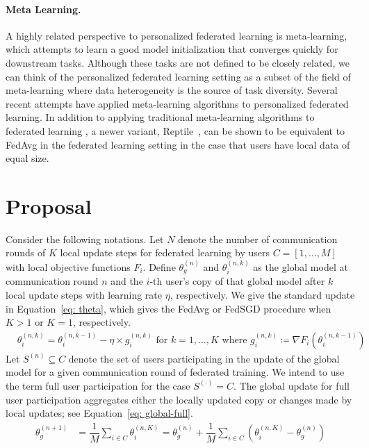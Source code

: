 \documentclass{article}
\begin{document}
%
\paragraph{Meta Learning.}
A highly related perspective to personalized federated learning is meta-learning, which attempts to learn a good model initialization that converges quickly for downstream tasks.
Although these tasks are not defined to be closely related, we can think of the personalized federated learning setting as a subset of the field of meta-learning where data heterogeneity is the source of task diversity. 
Several recent attempts have applied meta-learning algorithms to personalized federated learning.
In addition to applying traditional meta-learning algorithms to federated learning \citep{maml}, a newer variant, Reptile~\citep{reptile}, can be shown to be equivalent to FedAvg in the federated learning setting in the case that users have local data of equal size.




%
\section{Proposal}

Consider the following notations.
Let $N$ denote the number of communication rounds of $K$ local update steps for federated learning by users $C = \left[1, \ldots, M \right]$ with local objective functions $F_i$.
Define $\theta_g^{(n)}$ and $\theta_i^{(n, k)}$ as the global model at communication round $n$ and the $i$-th user's copy of that global model after $k$ local update steps with learning rate $\eta$, respectively.
We give the standard update in Equation~\ref{eq: theta}, which gives the FedAvg or FedSGD procedure when $K > 1$ or $K = 1$, respectively.
\begin{align}
    & \theta_i^{(n, k)} = \theta_i^{(n, k - 1)} - \eta \times g_i^{(n, k)} \textrm{ for } k = 1, \ldots, K \textrm{ where } g_i^{(n, k)} \coloneqq \nabla F_i(\theta_i^{(n, k - 1)}) \label{eq: theta}
\end{align}
Let $S^{(n)} \subseteq C$ denote the set of users participating in the update of the global model for a given communication round of federated training.
We intend to use the term full user participation for the case $S^{(\cdot)} = C$. 
The global update for full user participation aggregates either the locally updated copy or changes made by local updates; see Equation~\ref{eq: global-full}. 
\begin{align}
    \theta_g^{(n + 1)} &= \dfrac{1}{M} \sum_{i \in C} \theta_i^{(n, K)} = \theta_g^{(n)} + \dfrac{1}{M} \sum_{i \in C} \left( \theta_i^{(n, K)} - \theta_g^{(n)} \right) \label{eq: global-full}
\end{align}
\end{document}

